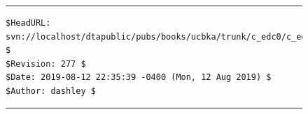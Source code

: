 \noindent\begin{figure}[!b]
\noindent\rule[-0.25in]{\textwidth}{1pt}
\begin{tiny}
\begin{verbatim}
$HeadURL: svn://localhost/dtapublic/pubs/books/ucbka/trunk/c_edc0/c_edc0.tex $
$Revision: 277 $
$Date: 2019-08-12 22:35:39 -0400 (Mon, 12 Aug 2019) $
$Author: dashley $
\end{verbatim}
\end{tiny}
\noindent\rule[0.25in]{\textwidth}{1pt}
\end{figure}

%
